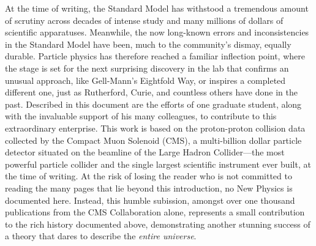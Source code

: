 \begin{dissertationintroduction}
At the time of writing, the Standard Model has withstood a tremendous amount of scrutiny across decades of intense study and many millions of dollars of scientific apparatuses. %
Meanwhile, the now long-known errors and inconsistencies in the Standard Model have been, much to the community's dismay, equally durable. %
Particle physics has therefore reached a familiar inflection point, where the stage is set for the next surprising discovery in the lab that confirms an unusual approach, like Gell-Mann's Eightfold Way, or inspires a completed different one, just as Rutherford, Curie, and countless others have done in the past. 
Described in this document are the efforts of one graduate student, along with the invaluable support of his many colleagues, to contribute to this extraordinary enterprise. 
This work is based on the proton-proton collision data collected by the Compact Muon Solenoid (CMS), a multi-billion dollar particle detector situated on the beamline of the Large Hadron Collider---the most powerful particle collider and the single largest scientific instrument ever built, at the time of writing. 
At the risk of losing the reader who is not committed to reading the many pages that lie beyond this introduction, no New Physics is documented here.
Instead, this humble subission, amongst over one thousand publications from the CMS Collaboration alone, represents a small contribution to the rich history documented above, demonstrating another stunning success of a theory that dares to describe the \textit{entire universe}.
\end{dissertationintroduction}

